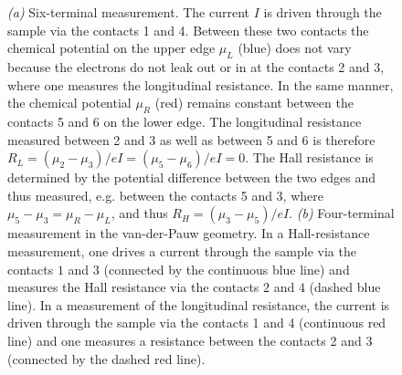 \documentclass[10pt]{book}
\begin{document}
\begin{figure}
\begin{center}
\end{center}
\caption{ {\sl (a)} Six-terminal measurement. The current $I$ is driven through the sample via the contacts 1 and 4.
Between these two contacts the chemical potential on the upper edge $\mu_L$ (blue) does not vary because the electrons
do not leak out or in at the contacts 2 and 3, where one measures the longitudinal resistance. In the same manner,
the chemical potential $\mu_R$ (red) remains constant between the contacts 5 and 6 on the lower edge. The longitudinal
resistance measured between 2 and 3 as well as between 5 and 6
is therefore $R_L=(\mu_2 - \mu_3)/eI=(\mu_5 - \mu_6)/eI = 0$. The Hall resistance is determined by the 
potential difference between the two edges and thus measured, e.g. between the contacts 5 and 3, where $\mu_5-\mu_3=\mu_R - \mu_L$,
and thus $R_H=(\mu_3-\mu_5)/eI$.
{\sl (b)} Four-terminal measurement in the van-der-Pauw geometry. In a Hall-resistance measurement, one drives a 
current through the sample via the contacts $1$ and $3$ (connected by the continuous blue line) and measures the Hall resistance
via the contacts $2$ and $4$ (dashed blue line). In a measurement of the longitudinal resistance, the current is driven
through the sample via the contacts 1 and 4 (continuous red line) and one measures a resistance between the contacts 2 and 3
(connected by the dashed red line).}
\label{fig14}
\end{figure}
\end{document}

